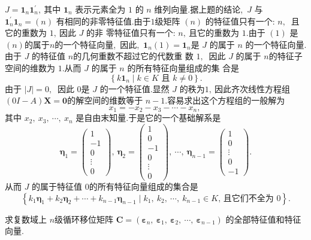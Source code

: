 \begin{solution}
	$J=\mathbf{1}_{n} \mathbf{1}_{n}^{\prime} ,\  $其中  $\mathbf{1}_{n} $ 表示元素全为 $1$ 的 $ n $ 维列向量.据上题的结论,\ $J$  与 $ \mathbf{1}_{n}^{\prime} \mathbf{1}_{n}=(n) $ 有相同的非零特征值.由于$ 1 $级矩阵 $ (n) $ 的特征值只有一个:  $n ,\ $ 且它的重数为 $1 ,\  $因此  $J $ 的非 零特征值只有一个:  $n ,\  $且它的重数为 $1 .$由于  $(1) $ 是 $ (n)  $的属于$  n  $的一个特征向量,\  因此,\  $ \mathbf{1}_{n}(1)=\mathbf{1}_{n}  $是 $ J $ 的属于  $n $ 的一个特征向量.由于 $ J $ 的特征值  $n  $的几何重数不超过它的代数重 数 $1 ,\ $ 因此  $J $ 的属于 $ n  $的特征子空间的维数为 $1.$从而  $J $ 的属于  $n $ 的所有特征向量组成的集 合是
	$$\left\{k \mathbf{1}_{n} \mid k \in K \text { 且 } k \neq 0\right\} .$$
	由于  $|J|=0 ,\ $ 因此 $0 $是  $J$  的一个特征值.显然  $J $ 的秩为$ 1 ,\  $因此齐次线性方程组  $(0 I-A) \boldsymbol{X}=\mathbf{0}  $的解空间的维数等于  $n-1 .$容易求出这个方程组的一般解为
	$$x_{1}=-x_{2}-x_{3}-\cdots-x_{n},\ $$
	其中 $ x_{2},\  x_{3},\  \cdots,\  x_{n} $ 是自由末知量.于是它的一个基础解系是
	$$\boldsymbol{\eta}_{1}=\left(\begin{array}{r}
		1 \\
		-1 \\
		0 \\
		\vdots \\
		0
	\end{array}\right),\  \boldsymbol{\eta}_{2}=\left(\begin{array}{r}
		1 \\
		0 \\
		-1 \\
		0 \\
		\vdots \\
		0
	\end{array}\right),\  \cdots,\  \boldsymbol{\eta}_{n-1}=\left(\begin{array}{r}
		1 \\
		0 \\
		\vdots \\
		0 \\
		-1
	\end{array}\right) .$$
	从而 $ J $ 的属于特征值 $0 $的所有特征向量组成的集合是
	$$\left\{k_{1} \boldsymbol{\eta}_{1}+k_{2} \boldsymbol{\eta}_{2}+\cdots+k_{n-1} \boldsymbol{\eta}_{n-1} \mid k_{1},\  k_{2},\  \cdots,\  k_{n-1} \in K \text {,\  且它们不全为 } 0\right\}.$$
\end{solution}
\newpage
\begin{problem}
	求复数域上 $ n  $级循环移位矩阵 $ \boldsymbol{C}=\left(\boldsymbol{\varepsilon}_{n},\  \boldsymbol{\varepsilon}_{1},\  \boldsymbol{\varepsilon}_{2},\  \cdots,\  \boldsymbol{\varepsilon}_{n-1}\right) $ 的全部特征值和特征 向量.
\end{problem}
